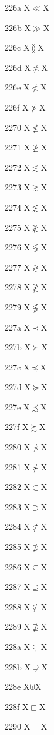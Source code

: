 \documentclass[11pt]{article}
\begin{document}
226a X{\ensuremath{\ll}}X

226b X{\ensuremath{\gg}}X

226c X{\ensuremath{\between}}X

226d X{\ensuremath{\not\asymp}}X

226e X{\ensuremath{\nless}}X

226f X{\ensuremath{\ngtr}}X

2270 X{\ensuremath{\nleq}}X

2271 X{\ensuremath{\ngeq}}X

2272 X{\ensuremath{\lesssim}}X

2273 X{\ensuremath{\gtrsim}}X

2274 X{\ensuremath{\nlesssim}}X

2275 X{\ensuremath{\ngtrsim}}X

2276 X{\ensuremath{\lessgtr}}X

2277 X{\ensuremath{\gtrless}}X

2278 X{\ensuremath{\ngtrless}}X

2279 X{\ensuremath{\nlessgtr}}X

227a X{\ensuremath{\prec}}X

227b X{\ensuremath{\succ}}X

227c X{\ensuremath{\preccurlyeq}}X

227d X{\ensuremath{\succcurlyeq}}X

227e X{\ensuremath{\precsim}}X

227f X{\ensuremath{\succsim}}X

2280 X{\ensuremath{\nprec}}X

2281 X{\ensuremath{\nsucc}}X

2282 X{\ensuremath{\subset}}X

2283 X{\ensuremath{\supset}}X

2284 X{\ensuremath{\nsubset}}X

2285 X{\ensuremath{\nsupset}}X

2286 X{\ensuremath{\subseteq}}X

2287 X{\ensuremath{\supseteq}}X

2288 X{\ensuremath{\nsubseteq}}X

2289 X{\ensuremath{\nsupseteq}}X

228a X{\ensuremath{\subsetneq}}X

228b X{\ensuremath{\supsetneq}}X

228e X{\ensuremath{\uplus}}X

228f X{\ensuremath{\sqsubset}}X

2290 X{\ensuremath{\sqsupset}}X
\end{document}
